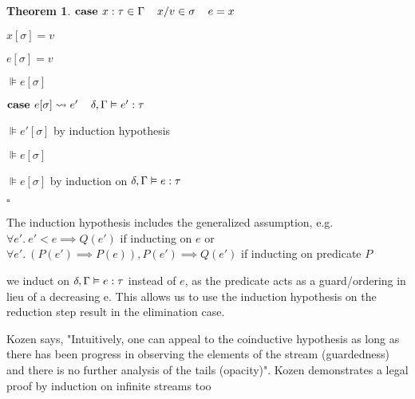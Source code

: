 \documentclass[acmsmall]{acmart}
\theoremstyle{definition}
\newtheorem{theorem}{Theorem}[section]
\begin{document}
\begin{theorem}
    \item \Z {}

    \item \Z $\textbf{case } 
      x : \tau \in \Gamma
      \hspace{4mm} 
      x \slash v \in \sigma
      \hspace{4mm} 
      e = x
    $
      \item \Z\Z $x[\sigma] = v$
      \item \Z\Z $e[\sigma] = v$
      \item \Z\Z $\VDash e[\sigma] $

    \item \Z $\textbf{case } 
      e[\sigma] \rightsquigarrow e' 
      \hspace{4mm} 
      \delta, \Gamma \vDash e' : \tau
    $ 
      \item \Z\Z $\VDash e'[\sigma] $ by induction hypothesis
      \item \Z\Z $\VDash e[\sigma] $

    \item \Z $\VDash e[\sigma] $ by induction on $\delta, \Gamma \vDash e : \tau$
  \item $\square$
  \item {}
\end{theorem}

\noindent
{} The induction hypothesis includes the generalized assumption, e.g. $\forall e' .\ e' < e \implies Q(e')$ if inducting on $e$ or $\forall e' .\ (P(e') \implies P(e)), P(e') \implies Q(e')$ if inducting on predicate $P$

\noindent
{} we induct on $\delta, \Gamma \vDash e : \tau$ instead of $e$, as the predicate acts as a guard/ordering in lieu of a decreasing e.
This allows us to use the induction hypothesis on the reduction step result in the elimination case.

\noindent
{} Kozen says, "Intuitively, one can appeal to the coinductive hypothesis as long as there
has been progress in observing the elements of the stream (guardedness) and there is no
further analysis of the tails (opacity)".  Kozen demonstrates a legal proof by induction on infinite streams too

\end{document}
